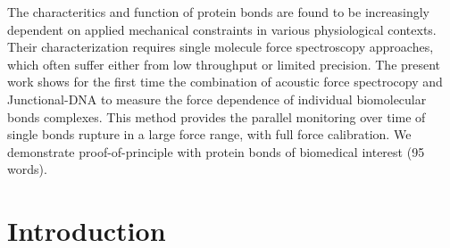 \documentclass{biophys-new}
\begin{document}
	The characteritics and function of protein bonds are found to be increasingly dependent on applied mechanical constraints in various physiological contexts. Their characterization requires single molecule force spectroscopy approaches, which often suffer either from low throughput or limited precision. The present work shows for the first time the combination of acoustic force spectrocopy and Junctional-DNA to measure the force dependence of individual biomolecular bonds complexes. This method provides the parallel monitoring over time of single bonds rupture in a large force range, with full force calibration.
	We demonstrate proof-of-principle with protein bonds of biomedical interest (95 words).


\section*{Introduction}
\end{document}
